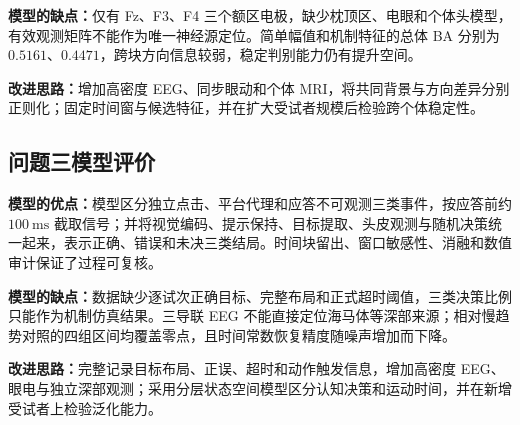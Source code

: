 \documentclass[a4paper]{ctexart}
\numberwithin{figure}{section}       %
\begin{document}
\textbf{模型的缺点：}仅有 Fz、F3、F4 三个额区电极，缺少枕顶区、电眼和个体头模型，有效观测矩阵不能作为唯一神经源定位。简单幅值和机制特征的总体 BA 分别为 $0.5161$、$0.4471$，跨块方向信息较弱，稳定判别能力仍有提升空间。

\textbf{改进思路：}增加高密度 EEG、同步眼动和个体 MRI，将共同背景与方向差异分别正则化；固定时间窗与候选特征，并在扩大受试者规模后检验跨个体稳定性。

\subsection{问题三模型评价}

\textbf{模型的优点：}模型区分独立点击、平台代理和应答不可观测三类事件，按应答前约 $100~\mathrm{ms}$ 截取信号；并将视觉编码、提示保持、目标提取、头皮观测与随机决策统一起来，表示正确、错误和未决三类结局。时间块留出、窗口敏感性、消融和数值审计保证了过程可复核。

\textbf{模型的缺点：}数据缺少逐试次正确目标、完整布局和正式超时阈值，三类决策比例只能作为机制仿真结果。三导联 EEG 不能直接定位海马体等深部来源；相对慢趋势对照的四组区间均覆盖零点，且时间常数恢复精度随噪声增加而下降。

\textbf{改进思路：}完整记录目标布局、正误、超时和动作触发信息，增加高密度 EEG、眼电与独立深部观测；采用分层状态空间模型区分认知决策和运动时间，并在新增受试者上检验泛化能力。
\end{document}
